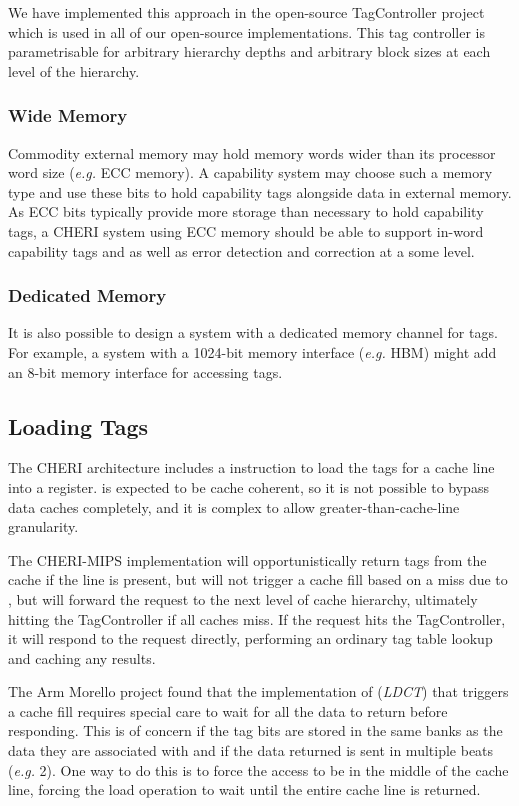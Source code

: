 We have implemented this approach in the open-source TagController project which is used in all of our open-source implementations.
This tag controller is parametrisable for arbitrary hierarchy depths and arbitrary block sizes at each level of the hierarchy.

\subsubsection{Wide Memory}
Commodity external memory may hold memory words wider than its processor word size (\textit{e.g.} ECC memory).
A capability system may choose such a memory type and use these bits to hold capability tags alongside data in external memory.
As ECC bits typically provide more storage than necessary to hold capability tags, a CHERI system using ECC memory should be able to support in-word capability tags and as well as error detection and correction at a some level.

\subsubsection{Dedicated Memory}
It is also possible to design a system with a dedicated memory channel for tags.
For example, a system with a 1024-bit memory interface (\textit{e.g.} HBM) might add an 8-bit memory interface for accessing tags.

\subsection{Loading Tags}
The CHERI architecture includes a  instruction to load the tags for a cache line into a register.
 is expected to be cache coherent, so it is not possible to bypass data caches completely, and it is complex to allow greater-than-cache-line granularity.

The CHERI-MIPS implementation will opportunistically return tags from the cache if the line is present, but will not trigger a cache fill based on a miss due to , but will forward the request to the next level of cache hierarchy, ultimately hitting the TagController if all caches miss.  If the request hits the TagController, it will respond to the request directly, performing an ordinary tag table lookup and caching any results.

The Arm Morello project found that the implementation of  (\emph{LDCT}) that triggers a cache fill requires special care to wait for all the data to return before responding.
This is of concern if the tag bits are stored in the same banks as the data they are associated with and if the data returned is sent in multiple beats (\textit{e.g.} 2).
One way to do this is to force the access to be in the middle of the cache line, forcing the load operation to wait until the entire cache line is returned.

